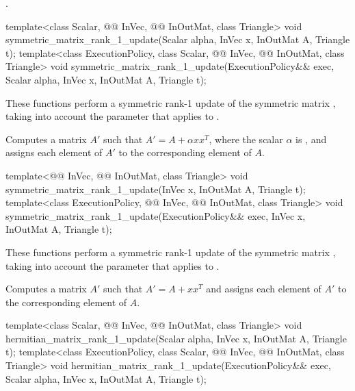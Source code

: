 \pnum
\complexity
{}.

\begin{itemdecl}
template<class Scalar, @@ InVec, @@ InOutMat, class Triangle>
  void symmetric_matrix_rank_1_update(Scalar alpha, InVec x, InOutMat A, Triangle t);
template<class ExecutionPolicy,
         class Scalar, @@ InVec, @@ InOutMat, class Triangle>
  void symmetric_matrix_rank_1_update(ExecutionPolicy&& exec,
                                      Scalar alpha, InVec x, InOutMat A, Triangle t);
\end{itemdecl}

\begin{itemdescr}
\pnum
These functions perform
a symmetric rank-1 update of the symmetric matrix ,
taking into account the  parameter
that applies to .

\pnum
\effects
Computes a matrix $A'$ such that
$A' = A + \alpha x x^T$, where the scalar $\alpha$ is ,
and assigns each element of $A'$ to the corresponding element of $A$.
\end{itemdescr}

\begin{itemdecl}
template<@@ InVec, @@ InOutMat, class Triangle>
  void symmetric_matrix_rank_1_update(InVec x, InOutMat A, Triangle t);
template<class ExecutionPolicy,
         @@ InVec, @@ InOutMat, class Triangle>
  void symmetric_matrix_rank_1_update(ExecutionPolicy&& exec, InVec x, InOutMat A, Triangle t);
\end{itemdecl}

\begin{itemdescr}
\pnum
These functions perform
a symmetric rank-1 update of the symmetric matrix ,
taking into account the  parameter
that applies to .

\pnum
\effects
Computes a matrix $A'$ such that $A' = A + x x^T$
and assigns each element of $A'$ to the corresponding element of $A$.
\end{itemdescr}

\begin{itemdecl}
template<class Scalar, @@ InVec, @@ InOutMat, class Triangle>
  void hermitian_matrix_rank_1_update(Scalar alpha, InVec x, InOutMat A, Triangle t);
template<class ExecutionPolicy,
         class Scalar, @@ InVec, @@ InOutMat, class Triangle>
  void hermitian_matrix_rank_1_update(ExecutionPolicy&& exec,
                                      Scalar alpha, InVec x, InOutMat A, Triangle t);
\end{itemdecl}

